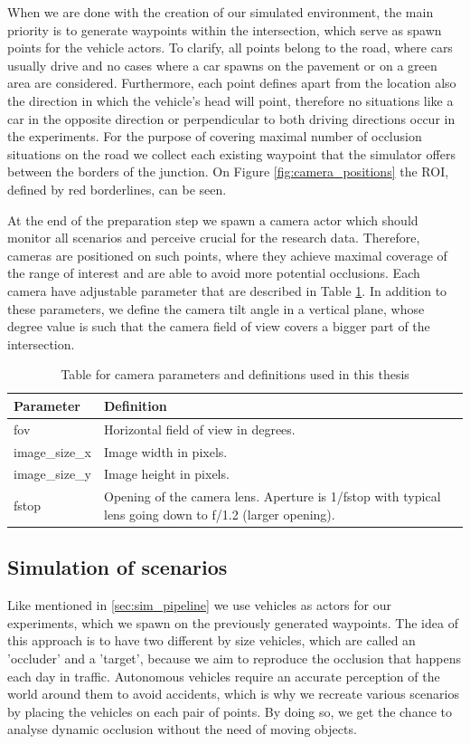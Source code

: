 When we are done with the creation of our simulated environment, the main priority is to generate waypoints within the intersection, which serve as spawn points for the vehicle actors. To clarify, all points belong to the road, where cars usually drive and no cases where a car spawns on the pavement or on a green area are considered. Furthermore, each point defines apart from the location also the direction in which the vehicle's head will point, therefore no situations like a car in the opposite direction or perpendicular to both driving directions occur in the experiments. For the purpose of covering maximal number of occlusion situations on the road we collect each existing waypoint that the simulator offers between the borders of the junction. On Figure \ref{fig:camera_positions} the ROI, defined by red borderlines, can be seen.

At the end of the preparation step we spawn a camera actor which should monitor all scenarios and perceive crucial for the research data. Therefore, cameras are positioned on such points, where they achieve maximal coverage of the range of interest and are able to avoid more potential occlusions. Each camera have adjustable parameter that are described in Table \ref{tab:camera_params}. In addition to these parameters, we define the camera tilt angle in a vertical plane, whose degree value is such that the camera field of view covers a bigger part of the intersection. 
\begin{table}[h]
\caption{Table for camera parameters and definitions used in this thesis\label{tab:camera_params}}
\centering
    \begin{tabular}{ | l | p{5cm} |}
    \hline
    Parameter & Definition  \\ \hline
    fov & Horizontal field of view in degrees. \\ \hline
    image\_size\_x & Image width in pixels. \\ \hline
    image\_size\_y & Image height in pixels. \\ \hline
    fstop & Opening of the camera lens. Aperture is 1/fstop with typical
    lens going down to f/1.2 (larger opening). \\ \hline
    \end{tabular}
\end{table}

\subsection{Simulation of scenarios}
Like mentioned in \ref{sec:sim_pipeline} we use vehicles as actors for our experiments, which we spawn on the previously generated waypoints. The idea of this approach is to have two different by size vehicles, which are called an 'occluder' and a 'target', because we aim to reproduce the occlusion that happens each day in traffic. Autonomous vehicles require an accurate perception of the world around them to avoid accidents, which is why we recreate various scenarios by placing the vehicles on each pair of points. By doing so, we get the chance to analyse dynamic occlusion without the need of moving objects.

